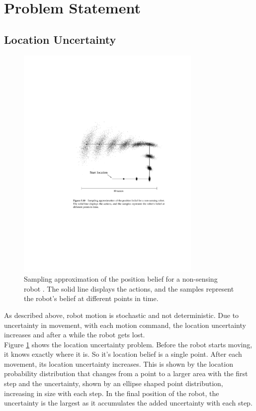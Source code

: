 \documentclass[conference]{IEEEtran}
\begin{document}
\section{Problem Statement}
\subsection{Location Uncertainty}

\begin{figure}[!t]
\centering
\includegraphics[width=3.5in]{./figures/LostRobot.pdf}
\caption{Sampling approximation of the position belief for a non-sensing robot \cite{thrun}. The solid line displays the actions, and the samples represent the robot’s belief at different points in time.}
\label{LostRobot}
\end{figure}

As described above, robot motion is stochastic and not deterministic. Due to  uncertainty in movement, with each motion command, the location uncertainty increases and after a while the robot gets lost.\\

Figure \ref{LostRobot} shows the location uncertainty problem. Before the robot starts moving, it knows exactly where it is. So it's location belief is a single point. After each movement, its location uncertainty increases. This is shown by the location probability distribution that changes from a point to a larger area with the first step and the uncertainty, shown by an ellipse shaped point distribution,  increasing in size with each step. In the final position of the robot, the uncertainty is the largest as it accumulates the added uncertainty with each step.\\
\end{document}
